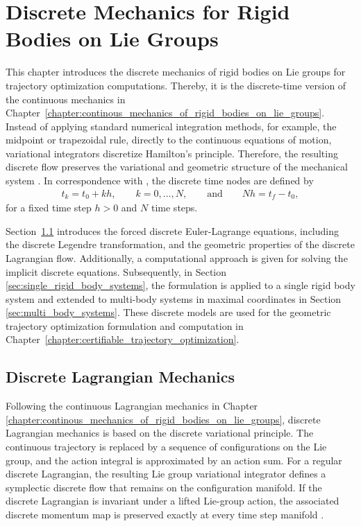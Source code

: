 \chapter{Discrete Mechanics for Rigid Bodies on Lie Groups}
\label{chapter:discrete_mechanics_for_rigid_bodies_on_lie_groups}

This chapter introduces the discrete mechanics of rigid bodies on Lie groups
for trajectory optimization computations. Thereby, it is the discrete-time 
version of the continuous mechanics in Chapter~\ref{chapter:continous_mechanics_of_rigid_bodies_on_lie_groups}. 
Instead of applying standard numerical integration methods, for example, 
the midpoint or trapezoidal rule, directly to the 
continuous equations of motion, variational integrators discretize Hamilton's 
principle. Therefore, the resulting discrete flow 
preserves the variational and geometric structure of the mechanical system 
\cite{Marsden2001,Leimkuhler_Reich_2005}. 
In correspondence with \cite{Lee2008}, the discrete time nodes 
are defined by
\begin{align*}
    t_k=t_0+kh,
    \qquad
    k=0,\ldots,N, 
    \qquad
    \text{and}
    \qquad
    Nh=t_f-t_0,
    \label{eq:discrete_time_grid}
\end{align*}
for a fixed time step $h>0$ and $N$ time steps.

Section~\ref{sec:discrete_lagrangian_mechanics} introduces the forced discrete
Euler-Lagrange equations, including the discrete Legendre transformation, and the 
geometric properties of the discrete Lagrangian flow. Additionally, a computational
approach is given for solving the implicit discrete equations. 
Subsequently, in Section \ref{sec:single_rigid_body_systems}, the formulation 
is applied to a single rigid body system and extended to 
multi-body systems in maximal coordinates in Section \ref{sec:multi_body_systems}. 
These discrete models are used for the geometric trajectory optimization
formulation and computation in 
Chapter~\ref{chapter:certifiable_trajectory_optimization}.

\section{Discrete Lagrangian Mechanics}
\label{sec:discrete_lagrangian_mechanics}

Following the continuous Lagrangian mechanics in 
Chapter \ref{chapter:continous_mechanics_of_rigid_bodies_on_lie_groups}, 
discrete Lagrangian mechanics is based on the discrete variational principle.
The continuous trajectory is replaced by 
a sequence of configurations on the Lie group, and the action integral is 
approximated by an action sum. For a regular discrete Lagrangian, the resulting Lie group 
variational integrator defines a symplectic discrete flow that remains on the configuration 
manifold. If the discrete Lagrangian is invariant under a lifted Lie-group action, the 
associated discrete 
momentum map is preserved exactly at every time step 
manifold \cite{Marsden2001,Lee2008}.

